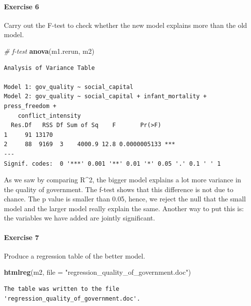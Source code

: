 \documentclass[]{article}
\newenvironment{Shaded}{\begin{snugshade}}{\end{snugshade}}
\newcommand{\KeywordTok}[1]{\textcolor[rgb]{0.13,0.29,0.53}{\textbf{#1}}}
\newcommand{\DataTypeTok}[1]{\textcolor[rgb]{0.13,0.29,0.53}{#1}}
\newcommand{\StringTok}[1]{\textcolor[rgb]{0.31,0.60,0.02}{#1}}
\newcommand{\CommentTok}[1]{\textcolor[rgb]{0.56,0.35,0.01}{\textit{#1}}}
\newcommand{\NormalTok}[1]{#1}
\let\oldparagraph\paragraph
\renewcommand{\paragraph}[1]{\oldparagraph{#1}\mbox{}}
\theoremstyle{definition}
\theoremstyle{definition}
\theoremstyle{definition}
\theoremstyle{remark}
\begin{document}
\paragraph{Exercise 6}\label{exercise-6-6}

Carry out the F-test to check whether the new model explains more than
the old model.

\begin{Shaded}
\begin{Highlighting}[]
\CommentTok{# f-test}
\KeywordTok{anova}\NormalTok{(m1.rerun, m2) }
\end{Highlighting}
\end{Shaded}

\begin{verbatim}
Analysis of Variance Table

Model 1: gov_quality ~ social_capital
Model 2: gov_quality ~ social_capital + infant_mortality + press_freedom + 
    conflict_intensity
  Res.Df   RSS Df Sum of Sq    F       Pr(>F)    
1     91 13170                                   
2     88  9169  3    4000.9 12.8 0.0000005133 ***
---
Signif. codes:  0 '***' 0.001 '**' 0.01 '*' 0.05 '.' 0.1 ' ' 1
\end{verbatim}

As we saw by comparing R\^{}2, the bigger model explains a lot more
variance in the quality of government. The f-test shows that this
difference is not due to chance. The p value is smaller than 0.05,
hence, we reject the null that the small model and the larger model
really explain the same. Another way to put this is: the variables we
have added are jointly significant.

\paragraph{Exercise 7}\label{exercise-7-5}

Produce a regression table of the better model.

\begin{Shaded}
\begin{Highlighting}[]
\KeywordTok{htmlreg}\NormalTok{(m2, }\DataTypeTok{file =} \StringTok{"regression_quality_of_government.doc"}\NormalTok{)}
\end{Highlighting}
\end{Shaded}

\begin{verbatim}
The table was written to the file 'regression_quality_of_government.doc'.
\end{verbatim}
\end{document}
